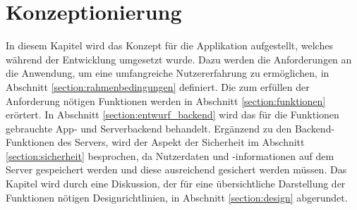 \chapter{Konzeptionierung}
In diesem Kapitel wird das Konzept für die Applikation aufgestellt, welches während der Entwicklung umgesetzt wurde. Dazu werden die Anforderungen an die Anwendung, um eine umfangreiche Nutzererfahrung zu ermöglichen, in Abschnitt \ref{section:rahmenbedingungen} definiert. Die zum erfüllen der Anforderung nötigen Funktionen werden in Abschnitt \ref{section:funktionen} erörtert. In Abschnitt \ref{section:entwurf_backend} wird das für die Funktionen gebrauchte App- und Serverbackend behandelt. Ergänzend zu den Backend-Funktionen des Servers, wird der Aspekt der Sicherheit im Abschnitt \ref{section:sicherheit} besprochen, da Nutzerdaten und -informationen auf dem Server gespeichert werden und diese ausreichend gesichert werden müssen. Das Kapitel wird durch eine Diskussion, der für eine übersichtliche Darstellung der Funktionen nötigen Designrichtlinien, in Abschnitt \ref{section:design} abgerundet.

